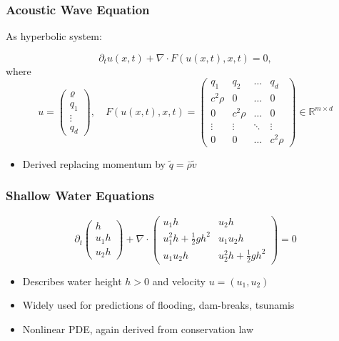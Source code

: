 \documentclass[ignorenonframetext,11pt]{beamer}
\theoremstyle{definition}
\begin{document}
\begin{frame}
\frametitle{Acoustic Wave Equation}
As hyperbolic system:

$$\partial_t u(x,t) + \nabla\cdot F(u(x,t),x,t) = 0,$$
where
$$u = \begin{pmatrix}
\varrho\\
q_1\\
\vdots\\
q_d
\end{pmatrix} ,\quad
F(u(x,t),x,t) = \left( \begin{matrix}
q_1  & q_2 & \dots & q_{d}\\
c^2\rho & 0 & \dots & 0\\
0 & c^2\rho & \dots & 0\\
\vdots & \vdots & \ddots & \vdots\\
0 & 0 & \dots & c^2\rho
\end{matrix} \right)\in \mathbb{R}^{m\times d} $$

\begin{itemize}
  \item Derived replacing momentum by $\tilde{q} = \bar{\rho} \tilde{v}$
\end{itemize}
\end{frame}


\begin{frame}
\frametitle{Shallow Water Equations}

\begin{equation*}\label{eq:swe2D}
\partial_t \begin{pmatrix}
h\\
u_1h\\
u_2h
\end{pmatrix}+ \nabla\cdot
\left( \begin{matrix}
u_1h   & u_2h\\
u_1^2h + \frac{1}{2}gh^2 & u_1u_2h\\
u_1u_2h & u_2^2h + \frac{1}{2}gh^2
\end{matrix}\right) = 0
\end{equation*}

\begin{itemize}
  \item Describes water height $h>0$ and velocity $u=(u_1,u_2)$
  \item Widely used for predictions of flooding, dam-breaks, tsunamis
  \item Nonlinear PDE, again derived from conservation law
\end{itemize}
\end{frame}
\end{document}
